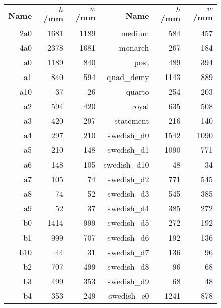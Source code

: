 \documentclass[a4paper,onecolumn,11pt]{book}
\begin{document}
\begin{figure}
\tiny \center
\begin{tabular}{|rrr|rrr|}
\hline
\textbf{Name} & \textbf{$h$/mm} & \textbf{$w$/mm} & \textbf{Name} & \textbf{$h$/mm} & \textbf{$w$/mm} \\
\hline
                       2a0 &   1681 &   1189 &           medium &    584 &    457 \\
                       4a0 &   2378 &   1681 &          monarch &    267 &    184 \\
                        a0 &   1189 &    840 &             post &    489 &    394 \\
                        a1 &    840 &    594 &        quad\_demy &   1143 &   889 \\
                       a10 &     37 &     26 &           quarto &    254 &    203 \\
                        a2 &    594 &    420 &            royal &    635 &    508 \\
                        a3 &    420 &    297 &        statement &    216 &    140 \\
                        a4 &    297 &    210 &       swedish\_d0 &   1542 &   1090 \\
                        a5 &    210 &    148 &       swedish\_d1 &   1090 &    771 \\
                        a6 &    148 &    105 &      swedish\_d10 &     48 &     34 \\
                        a7 &    105 &     74 &       swedish\_d2 &    771 &    545 \\
                        a8 &     74 &     52 &       swedish\_d3 &    545 &    385 \\
                        a9 &     52 &     37 &       swedish\_d4 &    385 &    272 \\
                        b0 &   1414 &    999 &       swedish\_d5 &    272 &    192 \\
                        b1 &    999 &    707 &       swedish\_d6 &    192 &    136 \\
                       b10 &     44 &     31 &       swedish\_d7 &    136 &     96 \\
                        b2 &    707 &    499 &       swedish\_d8 &     96 &     68 \\
                        b3 &    499 &    353 &       swedish\_d9 &     68 &     48 \\
                        b4 &    353 &    249 &       swedish\_e0 &   1241 &    878 \\

\end{tabular}
\end{figure}
\end{document}
